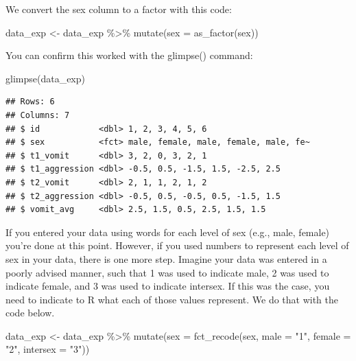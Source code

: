 \documentclass[
]{krantz}
\makeatletter
\newenvironment{Shaded}{\begin{snugshade}}{\end{snugshade}}
\newcommand{\AttributeTok}[1]{\textcolor[rgb]{0.61,0.61,0.61}{#1}}
\newcommand{\FunctionTok}[1]{\textcolor[rgb]{0,0,0}{#1}}
\newcommand{\NormalTok}[1]{#1}
\newcommand{\OtherTok}[1]{\textcolor[rgb]{0.37,0.37,0.37}{#1}}
\newcommand{\SpecialCharTok}[1]{\textcolor[rgb]{0,0,0}{#1}}
\newcommand{\StringTok}[1]{\textcolor[rgb]{0.5,0.5,0.5}{#1}}
\newenvironment{kframe}{%
\medskip{}
\setlength{\fboxsep}{.8em}
 \def\at@end@of@kframe{}%
 \ifinner\ifhmode%
  \def\at@end@of@kframe{\end{minipage}}%
  \begin{minipage}{\columnwidth}%
 \fi\fi%
 \def\FrameCommand##1{\hskip\@totalleftmargin \hskip-\fboxsep
 \colorbox{shadecolor}{##1}\hskip-\fboxsep
     \hskip-\linewidth \hskip-\@totalleftmargin \hskip\columnwidth}%
 \MakeFramed {\advance\hsize-\width
   \@totalleftmargin\z@ \linewidth\hsize
   \@setminipage}}%
 {\par\unskip\endMakeFramed%
 \at@end@of@kframe}
\renewenvironment{Shaded}{\begin{kframe}}{\end{kframe}}
\makeatother
\begin{document}
We convert the sex column to a factor with this code:

\begin{Shaded}
\begin{Highlighting}[]
\NormalTok{data\_exp }\OtherTok{\textless{}{-}}\NormalTok{ data\_exp }\SpecialCharTok{\%\textgreater{}\%}
  \FunctionTok{mutate}\NormalTok{(}\AttributeTok{sex =} \FunctionTok{as\_factor}\NormalTok{(sex))}
\end{Highlighting}
\end{Shaded}

You can confirm this worked with the glimpse() command:

\begin{Shaded}
\begin{Highlighting}[]
\FunctionTok{glimpse}\NormalTok{(data\_exp)}
\end{Highlighting}
\end{Shaded}

\begin{verbatim}
## Rows: 6
## Columns: 7
## $ id            <dbl> 1, 2, 3, 4, 5, 6
## $ sex           <fct> male, female, male, female, male, fe~
## $ t1_vomit      <dbl> 3, 2, 0, 3, 2, 1
## $ t1_aggression <dbl> -0.5, 0.5, -1.5, 1.5, -2.5, 2.5
## $ t2_vomit      <dbl> 2, 1, 1, 2, 1, 2
## $ t2_aggression <dbl> -0.5, 0.5, -0.5, 0.5, -1.5, 1.5
## $ vomit_avg     <dbl> 2.5, 1.5, 0.5, 2.5, 1.5, 1.5
\end{verbatim}

If you entered your data using words for each level of sex (e.g., male, female) you're done at this point. However, if you used numbers to represent each level of sex in your data, there is one more step. Imagine your data was entered in a poorly advised manner, such that 1 was used to indicate male, 2 was used to indicate female, and 3 was used to indicate intersex. If this was the case, you need to indicate to R what each of those values represent. We do that with the code below.

\begin{Shaded}
\begin{Highlighting}[]
\NormalTok{data\_exp }\OtherTok{\textless{}{-}}\NormalTok{ data\_exp }\SpecialCharTok{\%\textgreater{}\%}
  \FunctionTok{mutate}\NormalTok{(}\AttributeTok{sex =} \FunctionTok{fct\_recode}\NormalTok{(sex,}
                          \AttributeTok{male =} \StringTok{"1"}\NormalTok{,}
                          \AttributeTok{female =} \StringTok{"2"}\NormalTok{,}
                          \AttributeTok{intersex =} \StringTok{"3"}\NormalTok{))}
\end{Highlighting}
\end{Shaded}
\end{document}
